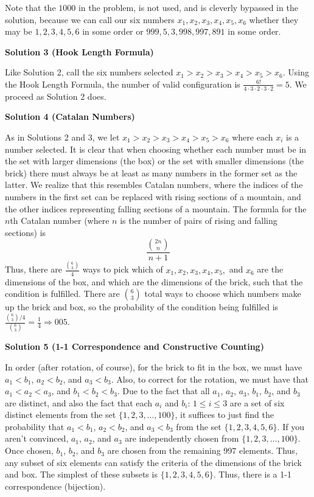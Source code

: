 \begin{enumerate}
 Note that the $1000$ in the problem, is not used, and is cleverly bypassed in the solution, because we can call our six numbers $x_1,x_2,x_3,x_4,x_5,x_6$ whether they may be $1,2,3,4,5,6$ in some order or $999,5,3,998,997,891$ in some order.

 



\textbf{Solution 3 (Hook Length Formula)}

Like Solution 2, call the six numbers selected $x_1 > x_2 > x_3 > x_4 > x_5 > x_6$. Using the Hook Length Formula, the number of valid configuration is $\frac{6!}{4\cdot3\cdot2\cdot3\cdot2}=5$. We proceed as Solution 2 does.

 



\textbf{Solution 4 (Catalan Numbers)}

As in Solutions 2 and 3, we let $x_1>x_2>x_3>x_4>x_5>x_6$ where each $x_i$ is a number selected.  It is clear that when choosing whether each number must be in the set with larger dimensions (the box) or the set with smaller dimensions (the brick) there must always be at least as many numbers in the former set as the latter.  We realize that this resembles Catalan numbers, where the indices of the numbers in the first set can be replaced with rising sections of a mountain, and the other indices representing falling sections of a mountain.  The formula for the $n$th Catalan number (where $n$ is the number of pairs of rising and falling sections) is 
 \[\frac{\binom{2n}{n}}{n+1}\]Thus, there are $\frac{\binom{6}{3}}{4}$ ways to pick which of $x_1,x_2,x_3,x_4,x_5,$ and $x_6$ are the dimensions of the box, and which are the dimensions of the brick, such that the condition is fulfilled.  There are $\binom{6}{3}$ total ways to choose which numbers make up the brick and box, so the probability of the condition being fulfilled is $\frac{\binom{6}{3}/4}{\binom{6}{3}}=\frac14\Longrightarrow \boxed{005}$.

 



\textbf{Solution 5 (1-1 Correspondence and Constructive Counting)}

In order (after rotation, of course), for the brick to fit in the box, we must have \( a_1 < b_1 \), \( a_2 < b_2 \), and \( a_3 < b_3 \). Also, to correct for the rotation, we must have that \( a_1 < a_2 < a_3 \), and \( b_1 < b_2 < b_3 \). Due to the fact that all \( a_1 \), \( a_2 \), \( a_3 \), \( b_1 \), \( b_2 \), and \( b_3 \) are distinct, and also the fact that each \( a_i \) and \( b_i \): \( 1 \le i \le 3 \) are a set of six distinct elements from the set \( \{1,2,3,\dots,100\} \), it suffices to just find the probability that \( a_1 < b_1 \), \( a_2 < b_2 \), and \( a_3 < b_3 \) from the set \( \{1,2,3,4,5,6\} \). If you aren't convinced, \( a_1 \), \( a_2 \), and \( a_3 \) are independently chosen from \( \{1,2,3,\dots,100\} \). Once chosen, \( b_1 \), \( b_2 \), and \( b_3 \) are chosen from the remaining 997 elements. Thus, any subset of six elements can satisfy the criteria of the dimensions of the brick and box. The simplest of these subsets is \( \{1,2,3,4,5,6\} \). Thus, there is a 1-1 correspondence (bijection).


\end{enumerate}
